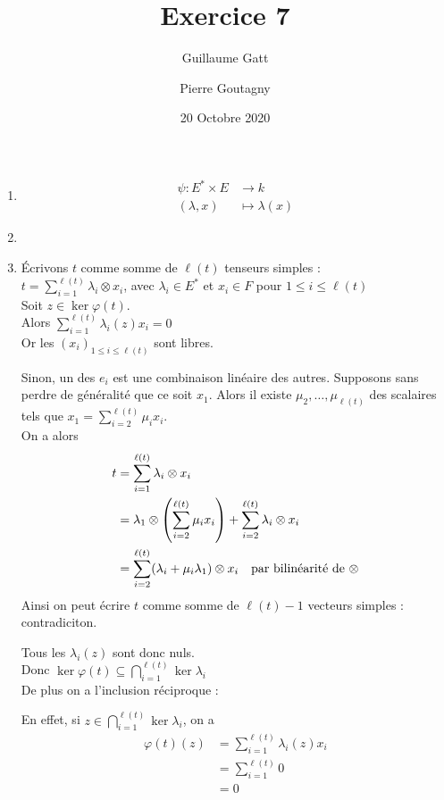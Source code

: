 \documentclass{article}
\title{Exercice 7}
\author{Guillaume Gatt \and Pierre Goutagny}
\date{20 Octobre 2020}
\def \r {{\ell(t)}}
\begin{document}
\thispagestyle{empty}
\begin{enumerate}[1., start=1]
    \item \begin{align*}
            \psi \colon E^{\ast} \times E &\longrightarrow k \\
                   (\lambda, x) &\longmapsto \lambda(x)
          \end{align*}

    \item

    \item \'Ecrivons $t$ comme somme de $\r$ tenseurs simples :\\
        $t = \sum_{i=1}^\r \lambda_i \otimes x_i$, avec $\lambda_i \in E^\ast$ et $x_i \in F$ pour $1 \leq i \leq \r$ \\
        Soit $z\in \ker\varphi(t)$.\\
        Alors $\sum_{i=1}^\r \lambda_i(z)x_i=0$\\
        Or les $(x_i)_{1\leq i \leq \r}$ sont libres.

        \par \setlength{\leftskip}{.2cm}
            Sinon, un des $e_i$ est une combinaison linéaire des autres. Supposons sans perdre de généralité que ce soit $x_1$. Alors il existe $\mu_2, \ldots, \mu_\r$ des scalaires tels que $x_1 = \sum_{i=2}^\r\mu_i x_i$.\\
            On a alors 
            \begin{align*} t &= \sum_{i=1}^\r \lambda_i \otimes x_i \\
                &= \lambda_1\otimes\left(\sum_{i=2}^\r\mu_i x_i \right) + \sum_{i=2}^\r \lambda_i \otimes x_i \\
                &= \sum_{i=2}^\r (\lambda_i + \mu_i \lambda_1) \otimes x_i \text{\quad par bilinéarité de }\otimes
            \end{align*}
            Ainsi on peut écrire $t$ comme somme de $\r - 1$ vecteurs simples : contradiciton.

        \par \setlength{\leftskip}{0cm}
        Tous les $\lambda_i(z)$ sont donc nuls.\\
        Donc $\displaystyle\ker\varphi(t) \subseteq \bigcap_{i=1}^\r\ker\lambda_i$\\
        De plus on a l'inclusion réciproque :

        \par \setlength{\leftskip}{.2cm}
            En effet, si $z\in \bigcap_{i=1}^\r\ker\lambda_i$, on a
            \begin{align*}
                \varphi(t)(z) &= \sum_{i=1}^\r\lambda_i(z)x_i \\
                              &= \sum_{i=1}^\r 0 \\
                              &= 0
            \end{align*}


\end{enumerate}
\end{document}
